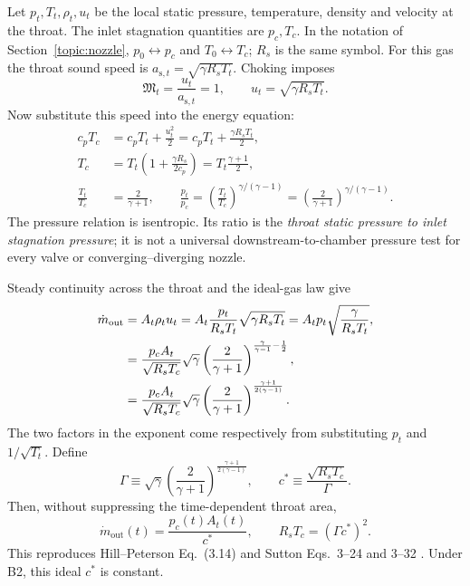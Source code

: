 Let $p_t,T_t,\rho_t,u_t$ be the local static pressure, temperature,
density and velocity at the throat. The inlet stagnation quantities
are $p_c,T_c$. In the notation of Section~\ref{topic:nozzle},
$p_0\leftrightarrow p_c$ and $T_0\leftrightarrow T_c$; $R_s$ is
the same symbol.
For this gas the throat sound speed is
$a_{\mathrm{s},t}=\sqrt{\gamma R_sT_t}$. Choking imposes
\begin{equation}\label{eq:sb-sonic-throat}
 \mathfrak M_t=\frac{u_t}{a_{\mathrm{s},t}}=1,
 \qquad u_t=\sqrt{\gamma R_sT_t}.
\end{equation}
Now substitute this speed into the energy equation:
\begin{align*}
 c_pT_c&=c_pT_t+\frac{u_t^2}{2}
        =c_pT_t+\frac{\gamma R_sT_t}{2},\\
 T_c&=T_t\left(1+\frac{\gamma R_s}{2c_p}\right)
     =T_t\frac{\gamma+1}{2},\\
 \frac{T_t}{T_c}&=\frac{2}{\gamma+1},\qquad
 \frac{p_t}{p_c}
 =\left(\frac{T_t}{T_c}\right)^{\gamma/(\gamma-1)}
 =\left(\frac{2}{\gamma+1}\right)^{\gamma/(\gamma-1)}.
\end{align*}
The pressure relation is isentropic. Its ratio is the
\emph{throat static pressure to inlet stagnation pressure};
it is not a universal downstream-to-chamber pressure test for
every valve or converging--diverging nozzle.

Steady continuity across the throat and the ideal-gas law give
\begin{align}
 \dot m_{\mathrm{out}}
 &=A_t\rho_tu_t
  =A_t\frac{p_t}{R_sT_t}\sqrt{\gamma R_sT_t}
  =A_t p_t\sqrt{\frac{\gamma}{R_sT_t}},\notag\\
 &=\frac{p_c A_t}{\sqrt{R_sT_c}}\sqrt{\gamma}
   \left(\frac{2}{\gamma+1}\right)^{
                  \frac{\gamma}{\gamma-1}-\frac12},\notag\\
 &=\frac{p_c A_t}{\sqrt{R_sT_c}}\sqrt{\gamma}
   \left(\frac{2}{\gamma+1}\right)^{
                  \frac{\gamma+1}{2(\gamma-1)}}.
   \label{eq:sb-throat-mass-derivation}
\end{align}
The two factors in the exponent come respectively from substituting
$p_t$ and $1/\sqrt{T_t}$. Define
\[
 \Gamma\equiv\sqrt{\gamma}
    \left(\frac{2}{\gamma+1}\right)^{\frac{\gamma+1}{2(\gamma-1)}},
 \qquad
 c^*\equiv\frac{\sqrt{R_sT_c}}{\Gamma}.
\]
Then, without suppressing the time-dependent throat area,
\begin{equation}\label{eq:sb-nozzle-flow}
 \dot m_{\mathrm{out}}(t)=\frac{p_c(t)A_t(t)}{c^*},
 \qquad R_sT_c=(\Gamma c^*)^2 .
\end{equation}
This reproduces Hill--Peterson Eq.~(3.14) \cite{hillpeterson}
and Sutton Eqs.~3--24 and 3--32 \cite{sutton}.
Under B2, this ideal $c^*$ is constant.

